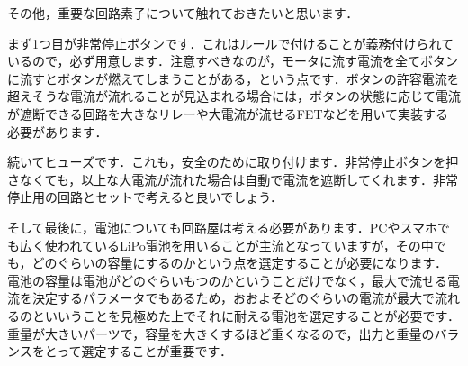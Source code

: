 その他，重要な回路素子について触れておきたいと思います．

まず1つ目が非常停止ボタンです．これはルールで付けることが義務付けられているので，必ず用意します．注意すべきなのが，モータに流す電流を全てボタンに流すとボタンが燃えてしまうことがある，という点です．ボタンの許容電流を超えそうな電流が流れることが見込まれる場合には，ボタンの状態に応じて電流が遮断できる回路を大きなリレーや大電流が流せるFETなどを用いて実装する必要があります．

続いてヒューズです．これも，安全のために取り付けます．非常停止ボタンを押さなくても，以上な大電流が流れた場合は自動で電流を遮断してくれます．非常停止用の回路とセットで考えると良いでしょう．

そして最後に，電池についても回路屋は考える必要があります．PCやスマホでも広く使われているLiPo電池を用いることが主流となっていますが，その中でも，どのぐらいの容量にするのかという点を選定することが必要になります．
電池の容量は電池がどのぐらいもつのかということだけでなく，最大で流せる電流を決定するパラメータでもあるため，おおよそどのぐらいの電流が最大で流れるのといいうことを見極めた上でそれに耐える電池を選定することが必要です．
重量が大きいパーツで，容量を大きくするほど重くなるので，出力と重量のバランスをとって選定することが重要です．
